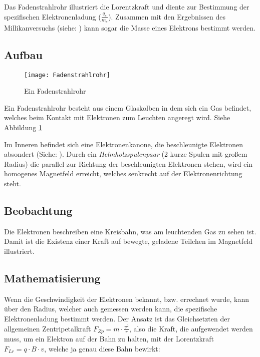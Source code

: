 Das Fadenstrahlrohr illustriert die Lorentzkraft und diente zur Bestimmung der spezifischen Elektronenladung ($\frac{q_e}{m_e}$). Zusammen mit den Ergebnissen des Millikanversuchs (siehe: ) kann sogar die Masse eines Elektrons bestimmt werden.

\subsection{Aufbau}

\begin{figure}[h!]
	\centering
	\texttt{[image: Fadenstrahlrohr]}
	\caption{Ein Fadenstrahlrohr}
	\label{fig:Fadenstrahlrohr}
\end{figure}

Ein Fadenstrahlrohr besteht aus einem Glaskolben in dem sich ein Gas befindet, welches beim Kontakt mit Elektronen zum Leuchten angeregt wird. Siehe Abbildung \ref{fig:Fadenstrahlrohr}

Im Inneren befindet sich eine Elektronenkanone, die beschleunigte Elektronen absondert (Siehe: ). Durch ein \emph{Helmholzspulenpaar} (2 kurze Spulen mit großem Radius) die parallel zur Richtung der beschleunigten Elektronen stehen, wird ein homogenes Magnetfeld erreicht, welches senkrecht auf der Elektronenrichtung steht.

\subsection{Beobachtung}

Die Elektronen beschreiben eine Kreisbahn, was am leuchtenden Gas zu sehen ist. Damit ist die Existenz einer Kraft auf bewegte, geladene Teilchen im Magnetfeld illustriert.

\subsection{Mathematisierung}

Wenn die Geschwindigkeit der Elektronen bekannt, bzw. errechnet wurde, kann über den Radius, welcher auch gemessen werden kann, die spezifische Elektronenladung bestimmt werden. Der Ansatz ist das Gleichsetzten der allgemeinen Zentripetalkraft $F_{Zp} = m \cdot \frac{v^2}{r}$, also die Kraft, die aufgewendet werden muss, um ein Elektron auf der Bahn zu halten, mit der Lorentzkraft  $F_{Lr} = q \cdot B \cdot v$, welche ja genau diese Bahn bewirkt:

